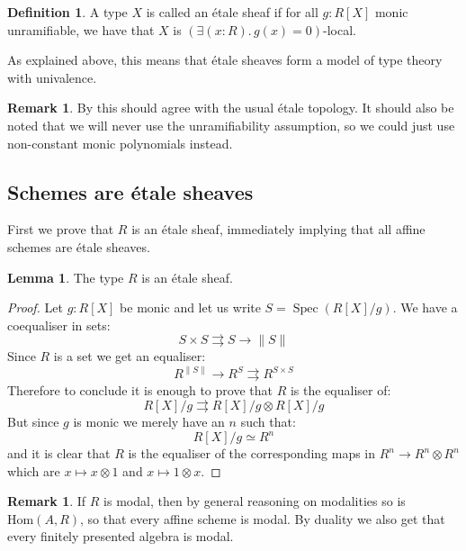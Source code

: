 \documentclass[10pt,a4paper]{article}
\theoremstyle{definition}
\newtheorem{lemma}[theorem]{Lemma}
\newtheorem{definition}[theorem]{Definition}
\newtheorem{remark}[theorem]{Remark}
\DeclareMathOperator{\Spec}{Spec}
\newcommand{\propTrunc}[1]{\lVert #1 \rVert}
\begin{document}
\begin{definition}
A type $X$ is called an \'etale sheaf if for all $g:R[X]$ monic unramifiable, we have that $X$ is $(\exists(x:R).\, g(x)=0)$-local.
\end{definition}

As explained above, this means that étale sheaves form a model of type theory with univalence.


\begin{remark}
  By \cite{wraith79} this should agree with the usual \'etale topology.
  It should also be noted that we will never use the unramifiability assumption, so we could just use non-constant monic polynomials instead.
\end{remark}


\subsection{Schemes are \'etale sheaves}

First we prove that $R$ is an étale sheaf, immediately implying that all affine schemes are étale sheaves.

\begin{lemma}\label{etale-subcanonical}
The type $R$ is an \'etale sheaf.
\end{lemma}

\begin{proof}
Let $g:R[X]$ be monic and let us write $S=\Spec(R[X]/g)$. We have a coequaliser in sets:
\[S\times S\rightrightarrows S \to \propTrunc{S}\]
Since $R$ is a set we get an equaliser:
\[R^{\propTrunc{S}} \to R^S\rightrightarrows R^{S\times S}\]
Therefore to conclude it is enough to prove that $R$ is the equaliser of:
\[R[X]/g \rightrightarrows R[X]/g \otimes R[X]/g\]
But since $g$ is monic we merely have an $n$ such that:
\[R[X]/g \simeq R^n\]
and it is clear that $R$ is the equaliser of the corresponding maps in $R^n \to R^n\otimes R^n$ which are $x\mapsto x\otimes 1$ and $x\mapsto 1\otimes x$.
\end{proof}

\begin{remark}\label{R-modal-subcanonical}
If $R$ is modal, then by general reasoning on modalities so is $\mathrm{Hom}(A,R)$, so that every affine scheme is modal. By duality we also get that every finitely presented algebra is modal.
\end{remark}
\end{document}
